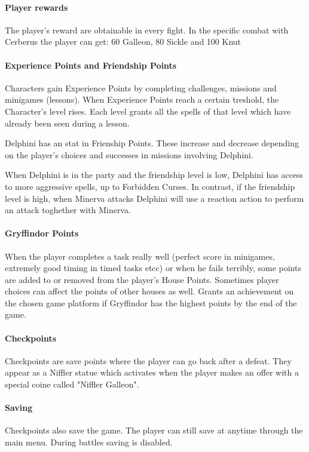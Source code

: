 \pagebreak

\paragraph{Player rewards}

The player's reward are obtainable in every fight. In the specific combat with Cerberus the player can get: 60 Galleon, 80 Sickle and 100 Knut


\paragraph{Experience Points and Friendship Points}

Characters gain Experience Points by completing challenges, missions and minigames (lessons). When Experience Points reach a certain treshold, the Character's level rises. 
Each level grants all the spells of that level which have already been seen during a lesson.

Delphini has an stat in Frienship Points. These increase and decrease depending on the player's choices and successes in missions involving Delphini.

When Delphini is in the party and the friendship level is low, Delphini has access to more aggressive spells, up to Forbidden Curses. 
In contrast, if the friendship level is high, when Minerva attacks Delphini will use a reaction action to perform an attack toghether with Minerva.


\paragraph{Gryffindor Points}

When the player completes a task really well (perfect score in minigames, extremely good timing in timed tasks etcc) or when he fails terribly, some points are added to or removed from the player's House Points. Sometimes player choices can affect the points of other houses as well.
Grants an achievement on the chosen game platform if Gryffindor has the highest points by the end of the game.

\pagebreak 

\paragraph{Checkpoints}

Checkpoints are save points where the player can go back after a defeat. They appear as a Niffler statue which activates when the player makes an offer with a special coine called "Niffler Galleon".

\paragraph{Saving}

Checkpoints also save the game. The player can still save at anytime through the main menu. During battles saving is disabled.
\pagebreak